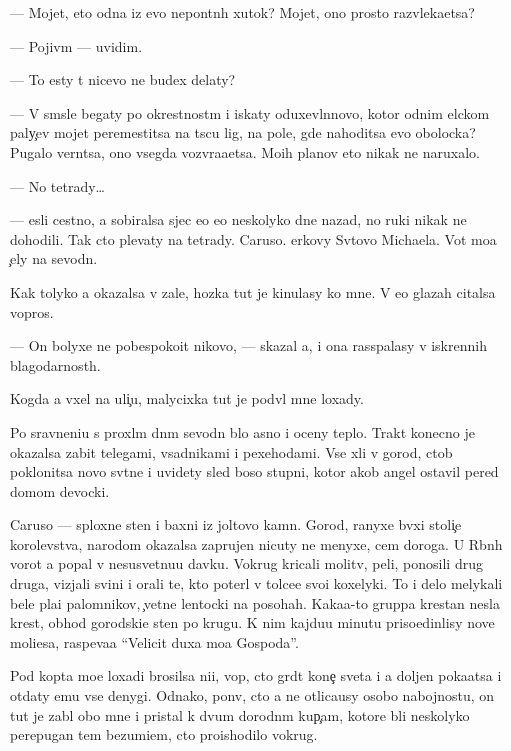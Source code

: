 \documentclass[10pt]{book}
\begin{document}
— Mojet, eto odna iz {\y}evo nepon{\ia}tn{\yi}h xutok? Mojet, ono prosto razvleka{\y}etsa?

— Pojiv{\e}m — uvidim.

— To {\y}esty t{\yi} nicevo ne budex delaty?

— V sm{\yi}sle begaty po okrestnost{\ia}m i iskaty oduxevl{\e}nnovo, kotor{\yi}{\y} odnim {\x}elckom paly{\c}ev mojet peremestitsa na t{\yi}s{\ia}cu lig, na pole, gde nahoditsa {\y}evo obo\-loc\-ka? Pugalo vern{\e}tsa, ono vsegda vozvra{\x}a{\y}etsa. Mo{\y}ih planov eto nikak ne naruxalo.

— No tetrady…

— {\Y}esli cestno, {\y}a sobiralsa sjec {\y}e{\y}o {\y}e{\x}o neskolyko dne{\y} nazad, no ruki nikak ne dohodili. Tak cto plevaty na tetrady. Caruso. {\C}erkovy Sv{\ia}tovo Michaela. Vot mo{\y}a {\c}ely na sevodn{\ia}.

Kak tolyko {\y}a okazalsa v zale, hoz{\ia}{\y}ka tut je kinulasy ko mne. V {\y}e{\y}o glazah citalsa vopros.

— On bolyxe ne pobespoko{\y}it nikovo, — skazal {\y}a, i ona rass{\yi}palasy v iskrennih blagodarnost{\ia}h.

Kogda {\y}a v{\yi}xel na uli{\c}u, malycixka tut je podv{\e}l mne loxady.

Po sravneni{\y}u s proxl{\yi}m dn{\e}m sevodn{\ia} b{\yi}lo {\y}asno i oceny teplo. Trakt konecno je okazalsa zabit telegami, vsadnikami i pexehodami. Vse xli v gorod, ctob{\yi} poklonitsa novo{\y} sv{\ia}t{\yi}ne i uvidety sled boso{\y} stupni, kotor{\yi}{\y} {\y}akob{\yi} angel ostavil pered domom devocki.

Caruso — sploxn{\yi}{\y}e sten{\yi} i baxni iz joltovo kamn{\ia}. Gorod, ranyxe b{\yi}vxi{\y} stoli{\c}e{\y} korolevstva, narodom okazalsa zaprujen nicuty ne menyxe, cem doroga. U R{\yi}bn{\yi}h vorot {\y}a popal v nesusvetnu{\y}u davku. Vokrug kricali molitv{\yi}, peli, ponosili drug druga, vizjali svin{\y}i i orali te, kto poter{\ia}l v tolce{\y}e svo{\y}i koxelyki. To i delo melykali bel{\yi}{\y}e pla{\x}i palomnikov, {\c}vetn{\yi}{\y}e lentocki na posohah. Kaka{\y}a-to gruppa krest{\y}an nesla krest, obhod{\ia} gorodski{\y}e sten{\yi} po krugu. K nim kajdu{\y}u minutu priso{\y}edin{\ia}lisy nov{\yi}{\y}e mol{\ia}{\x}i{\y}esa, raspeva{\y}a ``Velicit duxa mo{\y}a Gospoda''.

Pod kop{\yi}ta mo{\y}e{\y} loxadi brosilsa ni{\x}i{\y}, vop{\ia}, cto gr{\ia}d{\e}t kone{\c} sveta i {\y}a doljen poka{\y}atsa i otdaty {\y}emu vse denygi. Odnako, pon{\ia}v, cto {\y}a ne otlica{\y}usy osobo{\y} nabojnost{\y}u, on tut je zab{\yi}l obo mne i pristal k dvum dorodn{\yi}m kup{\c}am, ko\-to\-r{\yi}\-{\y}e b{\yi}li neskolyko perepugan{\yi} tem bezumi{\y}em, cto proishodilo vokrug.
\end{document}
